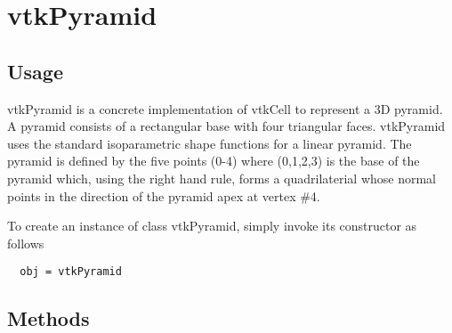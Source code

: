\section{vtkPyramid}

\subsection{Usage}

 vtkPyramid is a concrete implementation of vtkCell to represent a 3D
 pyramid. A pyramid consists of a rectangular base with four triangular
 faces. vtkPyramid uses the standard isoparametric shape functions for
 a linear pyramid. The pyramid is defined by the five points (0-4) where
 (0,1,2,3) is the base of the pyramid which, using the right hand rule,
 forms a quadrilaterial whose normal points in the direction of the
 pyramid apex at vertex \#4.

To create an instance of class vtkPyramid, simply
invoke its constructor as follows
\begin{verbatim}
  obj = vtkPyramid
\end{verbatim}
\subsection{Methods}

